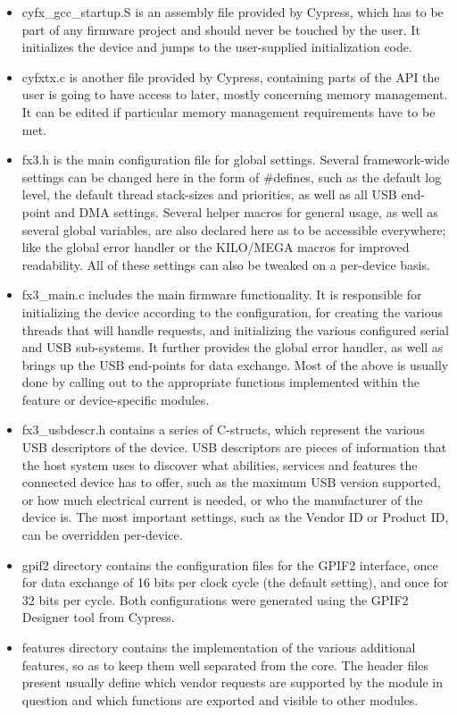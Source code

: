 \documentclass[a4paper,12pt]{report}
\begin{document}
\begin{itemize}
\item{cyfx\_gcc\_startup.S} is an assembly file provided by Cypress, which has to be part of any firmware project and should never be touched by the user. It initializes the device and jumps to the user-supplied initialization code.
\item{cyfxtx.c} is another file provided by Cypress, containing parts of the API the user is going to have access to later, mostly concerning memory management. It can be edited if particular memory management requirements have to be met.
\item{fx3.h} is the main configuration file for global settings. Several framework-wide settings can be changed here in the form of \#defines, such as the default log level, the default thread stack-sizes and priorities, as well as all USB end-point and DMA settings. Several helper macros for general usage, as well as several global variables, are also declared here as to be accessible everywhere; like the global error handler or the KILO/MEGA macros for improved readability. All of these settings can also be tweaked on a per-device basis.
\item{fx3\_main.c} includes the main firmware functionality. It is responsible for initializing the device according to the configuration, for creating the various threads that will handle requests, and initializing the various configured serial and USB sub-systems. It further provides the global error handler, as well as brings up the USB end-points for data exchange. Most of the above is usually done by calling out to the appropriate functions implemented within the feature or device-specific modules.
\item{fx3\_usbdescr.h} contains a series of C-structs, which represent the various USB descriptors of the device. USB descriptors are pieces of information that the host system uses to discover what abilities, services and features the connected device has to offer, such as the maximum USB version supported, or how much electrical current is needed, or who the manufacturer of the device is. The most important settings, such as the Vendor ID or Product ID, can be overridden per-device.
\item{gpif2 directory} contains the configuration files for the GPIF2 interface, once for data exchange of 16 bits per clock cycle (the default setting), and once for 32 bits per cycle. Both configurations were generated using the GPIF2 Designer tool from Cypress.
\item{features directory} contains the implementation of the various additional features, so as to keep them well separated from the core. The header files present usually define which vendor requests are supported by the module in question and which functions are exported and visible to other modules.

\end{itemize}
\end{document}

